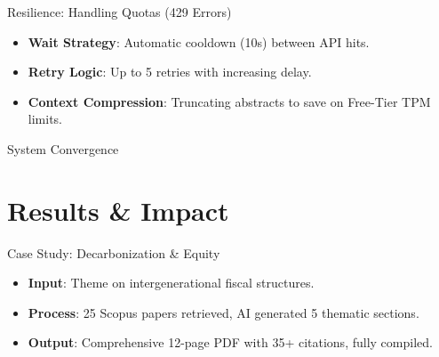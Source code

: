 \documentclass[10pt]{beamer}
\begin{document}
\begin{frame}{Resilience: Handling Quotas (429 Errors)}
    \vfill
    \begin{itemize}
        \item \textbf{Wait Strategy}: Automatic cooldown (10s) between API hits.
        \item \textbf{Retry Logic}: Up to 5 retries with increasing delay.
        \item \textbf{Context Compression}: Truncating abstracts to save on Free-Tier TPM limits.
    \end{itemize}
\end{frame}

\begin{frame}{System Convergence}
    \centering
\end{frame}

\section{Results \& Impact}
\begin{frame}{Case Study: Decarbonization \& Equity}
    \begin{itemize}
        \item \textbf{Input}: Theme on intergenerational fiscal structures.
        \item \textbf{Process}: 25 Scopus papers retrieved, AI generated 5 thematic sections.
        \item \textbf{Output}: Comprehensive 12-page PDF with 35+ citations, fully compiled.
    \end{itemize}
\end{frame}
\end{document}
